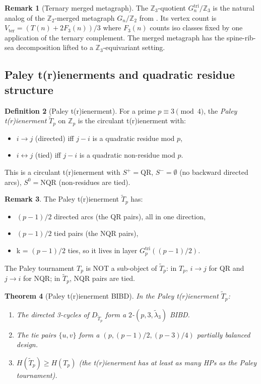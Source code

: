 \documentclass[12pt,reqno]{amsart}
\newtheorem{theorem}{Theorem}[section]
\theoremstyle{definition}
\newtheorem{definition}[theorem]{Definition}
\newtheorem{remark}[theorem]{Remark}
\theoremstyle{plain}
\begin{document}
\begin{remark}[Ternary merged metagraph]
The $\mathbb{Z}_3$-quotient $G_n^{\mathrm{tri}}/\mathbb{Z}_3$ is the natural
analog of the $\mathbb{Z}_2$-merged metagraph $G_n/\mathbb{Z}_2$ from
\cite{Cassidy2026}.  Its vertex count is
$V_{\mathrm{ter}}=(T(n)+2F_3(n))/3$
where $F_3(n)$ counts iso classes fixed by one application of the ternary
complement.  The merged metagraph has the spine-rib-sea decomposition
lifted to a $\mathbb{Z}_3$-equivariant setting.
\end{remark}

\subsection{Paley t(r)ienerments and quadratic residue structure}
\label{ssec:paley-trien}

\begin{definition}[Paley t(r)ienerment]\label{def:paley-trien}
For a prime $p\equiv 3\pmod 4$, the \emph{Paley t(r)ienerment} $\tilde{T}_p$
on $\mathbb{Z}_p$ is the circulant t(r)ienerment with:
\begin{itemize}
\item $i\to j$ (directed) iff $j-i$ is a quadratic residue mod $p$,
\item $i\leftrightarrow j$ (tied) iff $j-i$ is a quadratic non-residue mod $p$.
\end{itemize}
This is a circulant t(r)ienerment with $S^+=\mathrm{QR}$, $S^-=\emptyset$
(no backward directed arcs), $S^0=\mathrm{NQR}$ (non-residues are tied).
\end{definition}

\begin{remark}
The Paley t(r)ienerment $\tilde{T}_p$ has:
\begin{itemize}
\item $(p-1)/2$ directed arcs (the QR pairs), all in one direction,
\item $(p-1)/2$ tied pairs (the NQR pairs),
\item k = $(p-1)/2$ ties, so it lives in layer $G_p^{\mathrm{tri}}((p-1)/2)$.
\end{itemize}
The Paley tournament $T_p$ is NOT a sub-object of $\tilde{T}_p$: in $T_p$,
$i\to j$ for QR and $j\to i$ for NQR; in $\tilde{T}_p$, NQR pairs are tied.
\end{remark}

\begin{theorem}[Paley t(r)ienerment BIBD]\label{thm:paley-trien-bibd}
In the Paley t(r)ienerment $\tilde{T}_p$:
\begin{enumerate}
\item The directed 3-cycles of $D_{\tilde{T}_p}$ form a $2$-$(p,3,\tilde{\lambda}_3)$ BIBD.
\item The tie pairs $\{u,v\}$ form a $(p,(p-1)/2,(p-3)/4)$ partially balanced design.
\item $H(\tilde{T}_p)\ge H(T_p)$ (the t(r)ienerment has at least as many HPs as the
  Paley tournament).
\end{enumerate}
\end{theorem}
\end{document}
